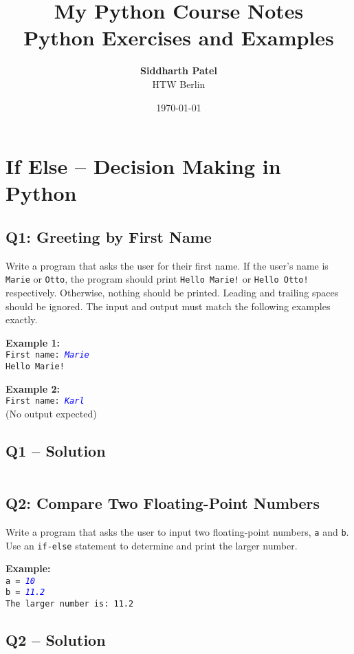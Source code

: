 \documentclass[a4paper,11pt]{article}
\title{\Huge \textbf{My Python Course Notes}\\[1ex]
	\Large Python Exercises and Examples}
\author{\textbf{Siddharth Patel} \\ HTW Berlin}
\date{\today}
\begin{document}
	
	\maketitle
	\thispagestyle{empty}
	\newpage
	\tableofcontents
	\newpage
	
	\section{If Else – Decision Making in Python}
	
	\subsection*{Q1: Greeting by First Name}
	Write a program that asks the user for their first name. If the user's name is \texttt{Marie} or \texttt{Otto}, the program should print \texttt{Hello Marie!} or \texttt{Hello Otto!} respectively. Otherwise, nothing should be printed. Leading and trailing spaces should be ignored. The input and output must match the following examples exactly.
	
	\textbf{Example 1:}\\
	\texttt{First name: \textcolor{blue}{\textit{Marie}}}\\
	\texttt{Hello Marie!}
	
	\textbf{Example 2:}\\
	\texttt{First name: \textcolor{blue}{\textit{Karl}}}\\
	(No output expected)
	
		\subsection*{Q1 – Solution}
		\inputminted{python}{Files/1/1.py}
	
	\subsection*{Q2: Compare Two Floating-Point Numbers}
	Write a program that asks the user to input two floating-point numbers, \texttt{a} and \texttt{b}. Use an \texttt{if-else} statement to determine and print the larger number.
	
	\textbf{Example:}\\
	\texttt{a = \textcolor{blue}{\textit{10}}}\\
	\texttt{b = \textcolor{blue}{\textit{11.2}}}\\
	\texttt{The larger number is: 11.2}
	
		
	\subsection*{Q2 – Solution}
		\inputminted{python}{Files/1/2.py}
	
\end{document}
